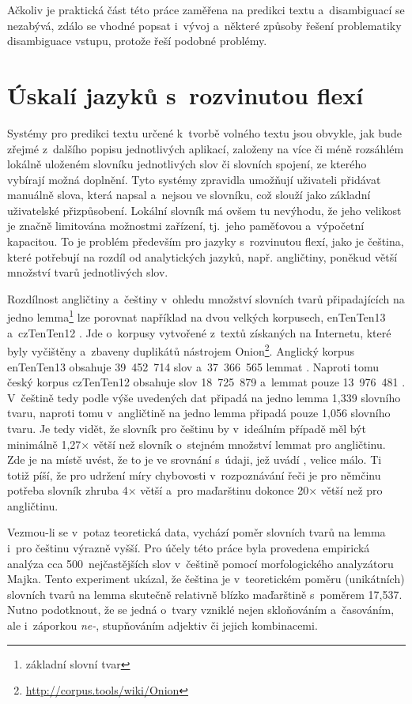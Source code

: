 \documentclass[a4paper,11pt,openany]{book} %
\begin{document}
Ačkoliv je praktická část této práce zaměřena na predikci textu a~disambiguací se nezabývá, zdálo se vhodné popsat i~vývoj a~některé způsoby řešení problematiky disambiguace vstupu, protože řeší podobné problémy.

\section{Úskalí jazyků s~rozvinutou flexí}

Systémy pro predikci textu určené k~tvorbě volného textu jsou obvykle, jak bude zřejmé z~dalšího popisu jednotlivých aplikací, založeny na více či méně rozsáhlém lokálně uloženém slovníku jednotlivých slov či slovních spojení, ze kterého vybírají možná doplnění. Tyto systémy zpravidla umožňují uživateli přidávat manuálně slova, která napsal a~nejsou ve slovníku, což slouží jako základní uživatelské přizpůsobení. Lokální slovník má ovšem tu nevýhodu, že jeho velikost je značně limitována možnostmi zařízení, tj.~jeho paměťovou a~výpočetní kapacitou. To je problém především pro jazyky s~rozvinutou flexí, jako je čeština, které potřebují na rozdíl od analytických jazyků, např. angličtiny, poněkud větší množství tvarů jednotlivých slov. 

Rozdílnost angličtiny a~češtiny v~ohledu množství slovních tvarů připadajících na jedno lemma\footnote{základní slovní tvar} lze porovnat například na dvou velkých korpusech, enTenTen13 a~czTenTen12 \parencite{suchomel2012}. Jde o~korpusy vytvořené z~textů získaných na Internetu, které byly vyčištěny a~zbaveny duplikátů nástrojem Onion\footnote{\url{http://corpus.tools/wiki/Onion}}. Anglický korpus enTenTen13 obsahuje 39~452~714 slov a~37~366~565 lemmat \parencite{czTenTen12_info}. Naproti tomu český korpus czTenTen12 obsahuje slov 18~725~879 a~lemmat pouze 13~976~481 \parencite{enTenTen13_info}. V~češtině tedy podle výše uvedených dat připadá na jedno lemma 1,339 slovního tvaru, naproti tomu v~angličtině na jedno lemma připadá pouze 1,056 slovního tvaru. Je tedy vidět, že slovník pro češtinu by v~ideálním případě měl být minimálně 1,27× větší než slovník o~stejném množství lemmat pro angličtinu. Zde je na místě uvést, že to je ve srovnání s~údaji, jež uvádí \textcite{nemeth2012word}, velice málo. Ti totiž píší, že pro udržení míry chybovosti v~rozpoznávání řeči je pro němčinu potřeba slovník zhruba 4× větší a~pro maďarštinu dokonce 20× větší než pro angličtinu.

Vezmou-li se v~potaz teoretická data, vychází poměr slovních tvarů na lemma i~pro češtinu výrazně vyšší. Pro účely této práce byla provedena empirická analýza cca 500~nejčastějších slov v~češtině pomocí morfologického analyzátoru Majka. Tento experiment ukázal, že čeština je v~teoretickém poměru (unikátních) slovních tvarů na lemma skutečně relativně blízko maďarštině s~poměrem 17,537. Nutno podotknout, že se jedná o~tvary vzniklé nejen skloňováním a~časováním, ale i~záporkou {\it ne-}, stupňováním adjektiv či jejich kombinacemi.
\end{document}
